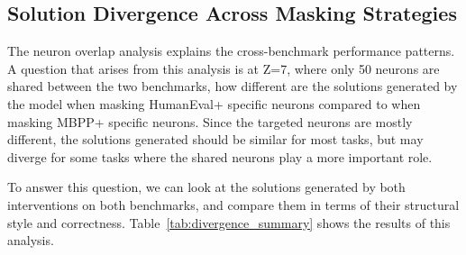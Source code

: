 \documentclass[mscthesis]{usiinfthesis}
\begin{document}
\subsection{Solution Divergence Across Masking Strategies}
The neuron overlap analysis explains the cross-benchmark performance patterns.
A question that arises from this analysis is at Z=7, where only 50 neurons are shared between the two benchmarks,
how different are the solutions generated by the model when masking HumanEval+ specific neurons compared to when masking MBPP+ specific neurons.
Since the targeted neurons are mostly different, the solutions generated should be similar for most tasks, but may diverge for some tasks where the shared neurons play a more important role.
\par\vspace{1em}
To answer this question, we can look at the solutions generated by both interventions on both benchmarks,
and compare them in terms of their structural style and correctness.
Table~\ref{tab:divergence_summary} shows the results of this analysis.
\end{document}
